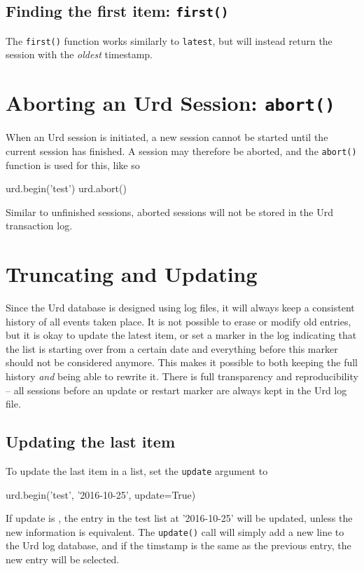 \subsection{Finding the first item:  \texttt{first()}}
The \texttt{first()} function works similarly to \texttt{latest}, but
will instead return the session with the \textsl{oldest} timestamp.





\section{Aborting an Urd Session:  \texttt{abort()}}

When an Urd session is initiated, a new session cannot be started
until the current session has finished.  A session may therefore be
aborted, and the \texttt{abort()} function is used for this, like so
\begin{python}
urd.begin('test')
urd.abort()
\end{python}
Similar to unfinished sessions, aborted sessions will not be stored in
the Urd transaction log.



\section{Truncating and Updating}
\label{sec:trunc-update}
Since the Urd database is designed using log files, it will always
keep a consistent history of all events taken place.  It is not
possible to erase or modify old entries, but it is okay to update the
latest item, or set a marker in the log indicating that the list is
starting over from a certain date and everything before this marker
should not be considered anymore.  This makes it possible to both
keeping the full history \textsl{and} being able to rewrite it.  There
is full transparency and reproducibility -- all sessions before an
update or restart marker are always kept in the Urd log file.



\subsection{Updating the last item}
To update the last item in a list, set the \texttt{update} argument
to \pyTrue
\begin{python}
urd.begin('test', '2016-10-25', update=True)
\end{python}
If update is \pyTrue, the entry in the test list at '2016-10-25' will
be updated, unless the new information is equivalent.
The \texttt{update()} call will simply add a new line to the Urd log
database, and if the timstamp is the same as the previous entry, the
new entry will be selected.



